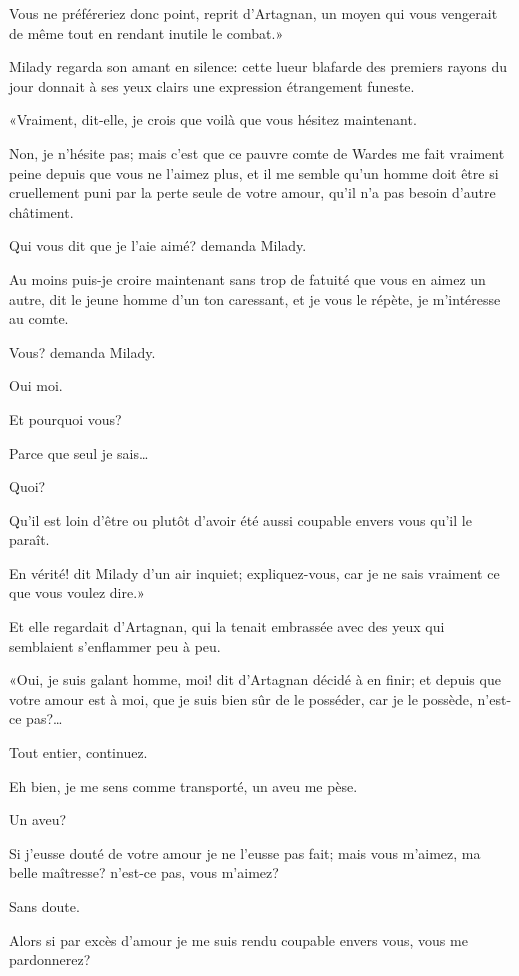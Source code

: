 \speak  Vous ne préféreriez donc point, reprit d'Artagnan, un moyen qui vous vengerait de même tout en rendant inutile le combat.» 

Milady regarda son amant en silence: cette lueur blafarde des premiers rayons du jour donnait à ses yeux clairs une expression étrangement funeste. 

«Vraiment, dit-elle, je crois que voilà que vous hésitez maintenant. 

\speak  Non, je n'hésite pas; mais c'est que ce pauvre comte de Wardes me fait vraiment peine depuis que vous ne l'aimez plus, et il me semble qu'un homme doit être si cruellement puni par la perte seule de votre amour, qu'il n'a pas besoin d'autre châtiment. 

\speak  Qui vous dit que je l'aie aimé? demanda Milady. 

\speak  Au moins puis-je croire maintenant sans trop de fatuité que vous en aimez un autre, dit le jeune homme d'un ton caressant, et je vous le répète, je m'intéresse au comte. 

\speak  Vous? demanda Milady. 

\speak  Oui moi. 

\speak  Et pourquoi vous? 

\speak  Parce que seul je sais\dots 

\speak  Quoi? 

\speak  Qu'il est loin d'être ou plutôt d'avoir été aussi coupable envers vous qu'il le paraît. 

\speak  En vérité! dit Milady d'un air inquiet; expliquez-vous, car je ne sais vraiment ce que vous voulez dire.» 

Et elle regardait d'Artagnan, qui la tenait embrassée avec des yeux qui semblaient s'enflammer peu à peu. 

«Oui, je suis galant homme, moi! dit d'Artagnan décidé à en finir; et depuis que votre amour est à moi, que je suis bien sûr de le posséder, car je le possède, n'est-ce pas?\dots 

\speak  Tout entier, continuez. 

\speak  Eh bien, je me sens comme transporté, un aveu me pèse. 

\speak  Un aveu? 

\speak  Si j'eusse douté de votre amour je ne l'eusse pas fait; mais vous m'aimez, ma belle maîtresse? n'est-ce pas, vous m'aimez? 

\speak  Sans doute. 

\speak  Alors si par excès d'amour je me suis rendu coupable envers vous, vous me pardonnerez? 

